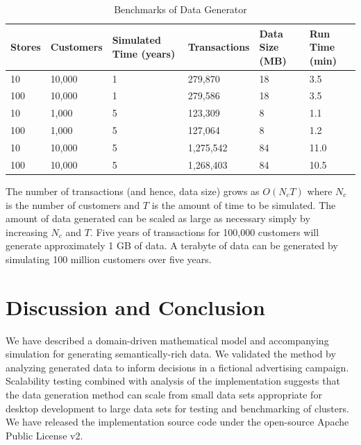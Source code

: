 \documentclass[conference]{IEEEtran}
\begin{document}
\begin{table}[!t]
\renewcommand{\arraystretch}{1.3}
\caption{Benchmarks of Data Generator}
\label{tab:benchmarks}
\centering
\begin{tabular}{|p{0.75cm}||p{1.2cm}||p{1cm}||p{1.25cm}||p{1cm}||p{1cm}|}
\hline
Stores & Customers & Simulated Time (years) & Transactions & Data Size (MB) & Run Time (min)\\ \hline
10 & 10,000 & 1 & 279,870 & 18 & 3.5 \\ \hline
100 & 10,000 & 1 & 279,586 & 18 & 3.5 \\ \hline
10 & 1,000 & 5 & 123,309 & 8 & 1.1 \\ \hline
100 & 1,000 & 5 & 127,064 & 8 & 1.2 \\ \hline
10 & 10,000 & 5 & 1,275,542 & 84 & 11.0 \\ \hline
100 & 10,000 & 5 & 1,268,403 & 84 & 10.5 \\ \hline
\end{tabular}
\end{table}

The number of transactions (and hence, data size) grows as $O(N_c T)$ where $N_c$ is the number of customers and $T$ is the amount of time to be simulated. The amount of data generated can be scaled as large as necessary simply by increasing $N_c$ and $T$. Five years of transactions for 100,000 customers will generate approximately 1 GB of data. A terabyte of data can be generated by simulating 100 million customers over five years. 

\section{Discussion and Conclusion}
We have described a domain-driven mathematical model and accompanying simulation for generating semantically-rich data.  We validated the method by analyzing generated data to inform decisions in a fictional advertising campaign. Scalability testing combined with analysis of the implementation suggests that the data generation method can scale from small data sets appropriate for desktop development to large data sets for testing and benchmarking of clusters. We have released the implementation source code under the open-source Apache Public License v2.
\end{document}
